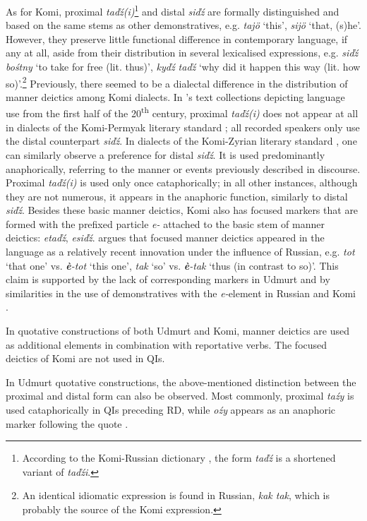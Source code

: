 \documentclass[output=paper,colorlinks,citecolor=brown]{langscibook}
\begin{document}
As for Komi, proximal \textit{taďź(i)}\footnote{According to the Komi-Russian dictionary \citep{BeznosikovaEtAl2000}, the form \textit{taďź} is a shortened variant of \textit{taďźi}.} and distal \textit{siďź} are formally distinguished and based on the same stems as other demonstratives, e.g. \textit{tajö} ‘this’, \textit{sijö} ‘that, (s)he’. However, they preserve little functional difference in contemporary language, if any at all, aside from their distribution in several lexicalised expressions, e.g. \textit{siďź bośtny} ‘to take for free (lit. thus)’, \textit{kyďź taďź} ‘why did it happen this way (lit. how so)’.\footnote{An identical idiomatic expression is found in Russian, \textit{kak tak}, which is probably the source of the Komi expression.} Previously, there seemed to be a dialectal difference in the distribution of manner deictics among Komi dialects. In \citeauthor{Uotila1985}’s text collections depicting language use from the first half of the 20\textsuperscript{th} century, proximal \textit{taďź(i)} does not appear at all in dialects of the Komi-Permyak literary standard \citep{Uotila1985}; all recorded speakers only use the distal counterpart \textit{siďź}. In dialects of the Komi-Zyrian literary standard \citep{Uotila1989}, one can similarly observe a preference for distal \textit{siďź}. It is used predominantly anaphorically, referring to the manner or events previously described in discourse. Proximal \textit{taďź(i)} is used only once cataphorically; in all other instances, although they are not numerous, it appears in the anaphoric function, similarly to distal \textit{siďź}. Besides these basic manner deictics, Komi also has focused markers that are formed with the prefixed particle \textit{e-} attached to the basic stem of manner deictics: \textit{etaďź}, \textit{esiďź}. \citet{Fedjuneva2009} argues that focused manner deictics appeared in the language as a relatively recent innovation under the influence of Russian, e.g. \textit{tot} ‘that one’ vs. \textit{\textbf{è}-tot} ‘this one’, \textit{tak} ‘so’ vs. \textit{\textbf{è}-tak} ‘thus (in contrast to so)’. This claim is supported by the lack of corresponding markers in Udmurt and by similarities in the use of demonstratives with the \textit{e-}element in Russian and Komi \citep[95-96]{Fedjuneva2009}.

In quotative constructions of both Udmurt and Komi, manner deictics are used as additional elements in combination with reportative verbs. The focused deictics of Komi are not used in QIs.

In Udmurt quotative constructions, the above-mentioned distinction between the proximal and distal form can also be observed. Most commonly, proximal \textit{taźy} is used cataphorically  in QIs preceding RD, while \textit{oźy} appears as an anaphoric marker following the quote .
\end{document}
